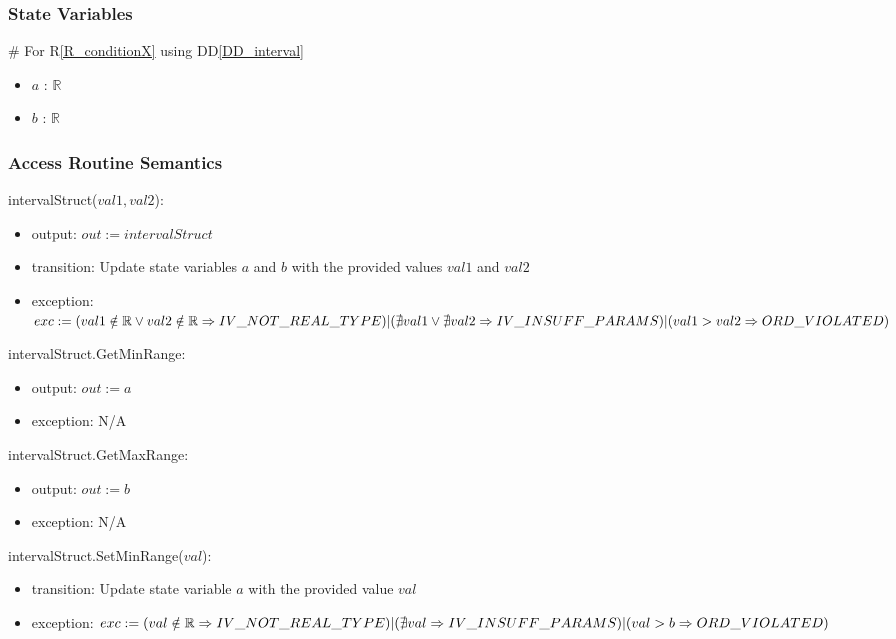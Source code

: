\documentclass[12pt, titlepage]{article}
\newcommand{\rref}[1]{R\ref{#1}}
\newcommand{\ddref}[1]{DD\ref{#1}}
\begin{document}
\subsubsection{State Variables}

\# For \rref{R_conditionX} using \ddref{DD_interval}
\begin{itemize}
	\item $a$ : $\mathbb{R}$
	\item $b$ : $\mathbb{R}$
\end{itemize}

\subsubsection{Access Routine Semantics}

\noindent intervalStruct($val1, val2$):
\begin{itemize}
	\item output: $out := intervalStruct$
	\item transition: Update state variables $a$ and $b$ with the provided 
	values $val1$ and $val2$
	\item exception: $exc := \\
	(val1 \notin \mathbb{R} \vee val2 \notin \mathbb{R} \Rightarrow 
	IV\_NOT\_REAL\_TYPE) \\
	|\\
	(\nexists val1 \vee \nexists val2 \Rightarrow IV\_INSUFF\_PARAMS)\\
	|\\
	(val1 > val2 \Rightarrow ORD\_VIOLATED)$
\end{itemize}

\noindent intervalStruct.GetMinRange:
\begin{itemize}
	\item output: $out := a$
	\item exception: N/A
\end{itemize}

\noindent intervalStruct.GetMaxRange:
\begin{itemize}
	\item output: $out := b$
	\item exception: N/A
\end{itemize}

\noindent intervalStruct.SetMinRange($val$):
\begin{itemize}
	\item transition: Update state variable $a$ with the provided value $val$
	\item exception: $exc := \\
	(val \notin \mathbb{R} \Rightarrow IV\_NOT\_REAL\_TYPE) \\
	|\\
	(\nexists val \Rightarrow IV\_INSUFF\_PARAMS) \\
	|\\
	(val > b \Rightarrow ORD\_VIOLATED)$
\end{itemize}
\end{document}
